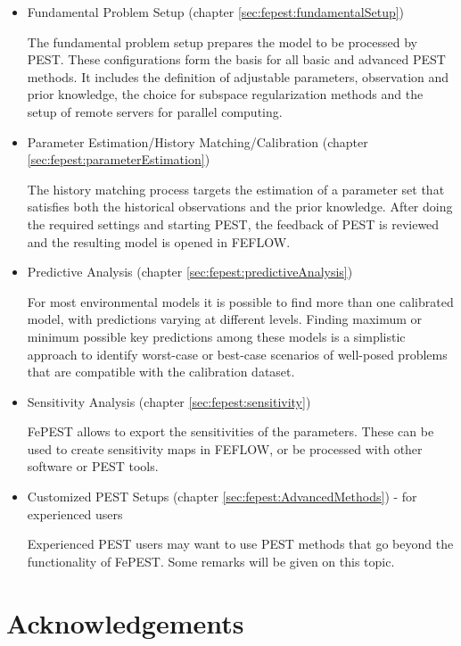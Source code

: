 \begin{itemize}
\item Fundamental Problem Setup (chapter \ref{sec:fepest:fundamentalSetup})

The fundamental problem setup prepares the model to be processed by PEST. These configurations form the basis for all basic and advanced PEST methods. It includes the definition of adjustable parameters, observation and prior knowledge, the choice for subspace regularization methods and the setup of remote servers for parallel computing.

\item Parameter Estimation/History Matching/Calibration (chapter \ref{sec:fepest:parameterEstimation})

The history matching process targets the estimation of a parameter set that satisfies both the historical observations and the prior knowledge. After doing the required settings and starting PEST, the feedback of PEST is reviewed and the resulting model is opened in FEFLOW.

\item Predictive Analysis (chapter \ref{sec:fepest:predictiveAnalysis})

For most environmental models it is possible to find more than one calibrated model, with predictions varying at different levels. Finding maximum or minimum possible key predictions among these models is a simplistic approach to identify worst-case or best-case scenarios of well-posed problems that are compatible with the calibration dataset. 

\item Sensitivity Analysis (chapter \ref{sec:fepest:sensitivity})

FePEST allows to export the sensitivities of the parameters. These can be used to create sensitivity maps in FEFLOW, or be processed with other software or PEST tools.

\item Customized PEST Setups (chapter \ref{sec:fepest:AdvancedMethods}) - for experienced users 

Experienced PEST users may want to use PEST methods that go beyond the functionality of FePEST. Some remarks will be given on this topic.
\end{itemize}

\section{Acknowledgements}

